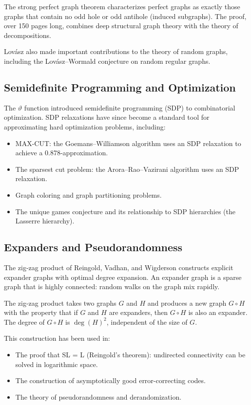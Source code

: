 The strong perfect graph theorem characterizes perfect graphs as exactly those graphs that contain no odd hole or odd antihole (induced subgraphs). The proof, over 150 pages long, combines deep structural graph theory with the theory of decompositions.

Lov\'asz also made important contributions to the theory of random graphs, including the Lov\'asz--Wormald conjecture on random regular graphs.

\subsection{Semidefinite Programming and Optimization}

The $\vartheta$ function introduced semidefinite programming (SDP) to combinatorial optimization. SDP relaxations have since become a standard tool for approximating hard optimization problems, including:
\begin{itemize}
\item MAX-CUT: the Goemans--Williamson algorithm uses an SDP relaxation to achieve a 0.878-approximation.
\item The sparsest cut problem: the Arora--Rao--Vazirani algorithm uses an SDP relaxation.
\item Graph coloring and graph partitioning problems.
\item The unique games conjecture and its relationship to SDP hierarchies (the Lasserre hierarchy).
\end{itemize}

\subsection{Expanders and Pseudorandomness}

The zig-zag product of Reingold, Vadhan, and Wigderson constructs explicit expander graphs with optimal degree expansion. An expander graph is a sparse graph that is highly connected: random walks on the graph mix rapidly.

The zig-zag product takes two graphs $G$ and $H$ and produces a new graph $G \circ H$ with the property that if $G$ and $H$ are expanders, then $G \circ H$ is also an expander. The degree of $G \circ H$ is $\deg(H)^2$, independent of the size of $G$.

This construction has been used in:
\begin{itemize}
\item The proof that SL = L (Reingold's theorem): undirected connectivity can be solved in logarithmic space.
\item The construction of asymptotically good error-correcting codes.
\item The theory of pseudorandomness and derandomization.
\end{itemize}

